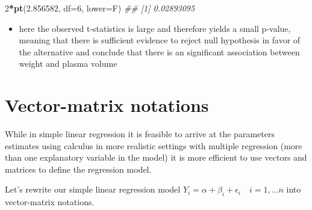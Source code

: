 \documentclass[
]{book}
\newenvironment{Shaded}{\begin{snugshade}}{\end{snugshade}}
\newcommand{\CommentTok}[1]{\textcolor[rgb]{0.56,0.35,0.01}{\textit{#1}}}
\newcommand{\DataTypeTok}[1]{\textcolor[rgb]{0.13,0.29,0.53}{#1}}
\newcommand{\DecValTok}[1]{\textcolor[rgb]{0.00,0.00,0.81}{#1}}
\newcommand{\FloatTok}[1]{\textcolor[rgb]{0.00,0.00,0.81}{#1}}
\newcommand{\KeywordTok}[1]{\textcolor[rgb]{0.13,0.29,0.53}{\textbf{#1}}}
\newcommand{\NormalTok}[1]{#1}
\newcommand{\OperatorTok}[1]{\textcolor[rgb]{0.81,0.36,0.00}{\textbf{#1}}}
\providecommand{\tightlist}{%
  \setlength{\itemsep}{0pt}\setlength{\parskip}{0pt}}
\theoremstyle{definition}
\theoremstyle{definition}
\theoremstyle{definition}
\theoremstyle{remark}
\begin{document}
\begin{Shaded}
\begin{Highlighting}[]
\DecValTok{2}\OperatorTok{*}\KeywordTok{pt}\NormalTok{(}\FloatTok{2.856582}\NormalTok{, }\DataTypeTok{df=}\DecValTok{6}\NormalTok{, }\DataTypeTok{lower=}\NormalTok{F)}
\CommentTok{\#\# [1] 0.02893095}
\end{Highlighting}
\end{Shaded}

\begin{itemize}
\tightlist
\item
  here the observed t-statistics is large and therefore yields a small p-value, meaning that there is sufficient evidence to reject null hypothesis in favor of the alternative and conclude that there is an significant association between weight and plasma volume
\end{itemize}

\hypertarget{vector-matrix-notations}{%
\section{Vector-matrix notations}\label{vector-matrix-notations}}

While in simple linear regression it is feasible to arrive at the parameters estimates using calculus in more realistic settings with multiple regression (more than one explanatory variable in the model) it is more efficient to use vectors and matrices to define the regression model.

Let's rewrite our simple linear regression model \(Y_i = \alpha + \beta_i + \epsilon_i \quad i=1,\dots n\) into vector-matrix notations.
\end{document}
